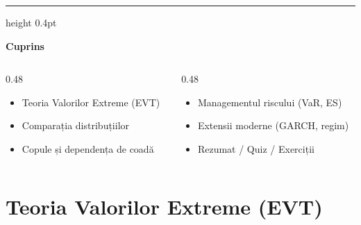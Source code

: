 \documentclass[9pt, aspectratio=169, t]{beamer}
\theoremstyle{definition}
\begin{document}
{
\begin{frame}{}
    {\color{FooterGray}\hrule height 0.4pt}
    \vspace{0.1cm}
    {\Large\textcolor{IDAred}{\textbf{Cuprins}}}
    \vspace{0.2cm}
    {\small
    \begin{columns}[T]
        \begin{column}{0.48\textwidth}
            \begin{itemize}
                \item Teoria Valorilor Extreme (EVT)
                \item Comparația distribuțiilor
                \item Copule și dependența de coadă
            \end{itemize}
        \end{column}
        \begin{column}{0.48\textwidth}
            \begin{itemize}
                \item Managementul riscului (VaR, ES)
                \item Extensii moderne (GARCH, regim)
                \item Rezumat / Quiz / Exerciții
            \end{itemize}
        \end{column}
    \end{columns}
    }
\end{frame}
}

\section{Teoria Valorilor Extreme (EVT)}
\end{document}
